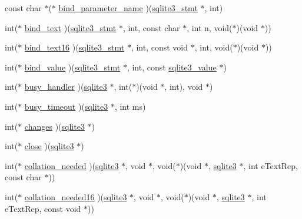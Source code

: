 \begin{DoxyCompactItemize}
\item 
const char $\ast$($\ast$ \hyperlink{structsqlite3__api__routines_a9d8e99fd21fd5929fc6c254060d8f83b}{bind\+\_\+parameter\+\_\+name} )(\hyperlink{sqlite3_8h_af2a033da1327cdd77f0a174a09aedd0c}{sqlite3\+\_\+stmt} $\ast$, int)
\item 
int($\ast$ \hyperlink{structsqlite3__api__routines_a0b489499ca3b7e212d25ea8a86d38f0e}{bind\+\_\+text} )(\hyperlink{sqlite3_8h_af2a033da1327cdd77f0a174a09aedd0c}{sqlite3\+\_\+stmt} $\ast$, int, const char $\ast$, int n, void($\ast$)(void $\ast$))
\item 
int($\ast$ \hyperlink{structsqlite3__api__routines_ab6ad28704caf8337cf5a395154e8941c}{bind\+\_\+text16} )(\hyperlink{sqlite3_8h_af2a033da1327cdd77f0a174a09aedd0c}{sqlite3\+\_\+stmt} $\ast$, int, const void $\ast$, int, void($\ast$)(void $\ast$))
\item 
int($\ast$ \hyperlink{structsqlite3__api__routines_a8f3424b59d6bbc836c233a44a2fd9a36}{bind\+\_\+value} )(\hyperlink{sqlite3_8h_af2a033da1327cdd77f0a174a09aedd0c}{sqlite3\+\_\+stmt} $\ast$, int, const \hyperlink{sqlite3_8h_ac2fa1ecdb2290d9af6010edbd1cbc83c}{sqlite3\+\_\+value} $\ast$)
\item 
int($\ast$ \hyperlink{structsqlite3__api__routines_ad7b688e04d388cdeb13d4c06fedb1c46}{busy\+\_\+handler} )(\hyperlink{sqlite3_8h_a0ef6f2646262c8a9b24368d8ac140f69}{sqlite3} $\ast$, int($\ast$)(void $\ast$, int), void $\ast$)
\item 
int($\ast$ \hyperlink{structsqlite3__api__routines_a8a4a2ccc0c7587e6c5c4db5f4b03246b}{busy\+\_\+timeout} )(\hyperlink{sqlite3_8h_a0ef6f2646262c8a9b24368d8ac140f69}{sqlite3} $\ast$, int ms)
\item 
int($\ast$ \hyperlink{structsqlite3__api__routines_aef4d7748f5708731e0aaf54dbfbbec33}{changes} )(\hyperlink{sqlite3_8h_a0ef6f2646262c8a9b24368d8ac140f69}{sqlite3} $\ast$)
\item 
int($\ast$ \hyperlink{structsqlite3__api__routines_a5c30292eef0130d7e8a408c4e3396012}{close} )(\hyperlink{sqlite3_8h_a0ef6f2646262c8a9b24368d8ac140f69}{sqlite3} $\ast$)
\item 
int($\ast$ \hyperlink{structsqlite3__api__routines_a4ecc8645b639cabe1fb630aceaec9017}{collation\+\_\+needed} )(\hyperlink{sqlite3_8h_a0ef6f2646262c8a9b24368d8ac140f69}{sqlite3} $\ast$, void $\ast$, void($\ast$)(void $\ast$, \hyperlink{sqlite3_8h_a0ef6f2646262c8a9b24368d8ac140f69}{sqlite3} $\ast$, int e\+Text\+Rep, const char $\ast$))
\item 
int($\ast$ \hyperlink{structsqlite3__api__routines_aa035538977ec61fe6df923b78db33962}{collation\+\_\+needed16} )(\hyperlink{sqlite3_8h_a0ef6f2646262c8a9b24368d8ac140f69}{sqlite3} $\ast$, void $\ast$, void($\ast$)(void $\ast$, \hyperlink{sqlite3_8h_a0ef6f2646262c8a9b24368d8ac140f69}{sqlite3} $\ast$, int e\+Text\+Rep, const void $\ast$))

\end{DoxyCompactItemize}
